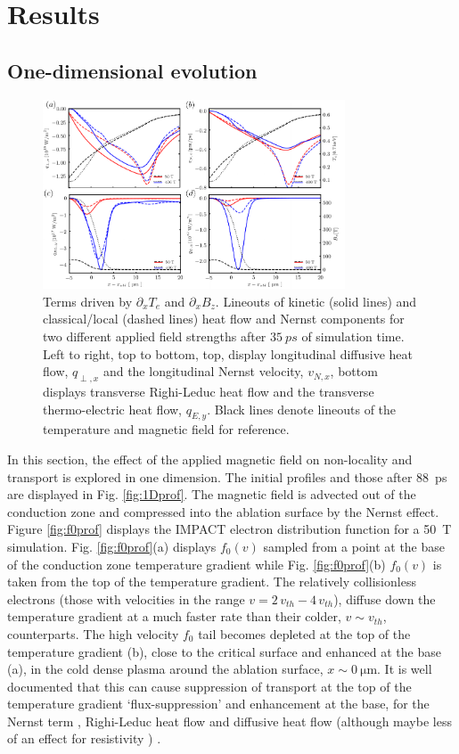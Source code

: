 \documentclass[aip,reprint]{revtex4-1}
\begin{document}
\section{Results}
\subsection{One-dimensional evolution}
\label{sec:1D}
\begin{figure}
	\includegraphics[width=0.8\textwidth]{pics/qlineouts_4plots.pdf}%
	\caption{\label{fig:qlineouts} \label{fig:qperp_1d} Terms driven by $\partial_x T_e$ and $\partial_x B_{z}$. Lineouts of kinetic (solid lines) and classical/local (dashed lines) heat flow  and Nernst components for two different applied field strengths after $\SI{35}{ps}$ of simulation time. Left to right, top to bottom, top, display longitudinal diffusive heat flow, $q_{\perp,x}$ and the longitudinal Nernst velocity, $v_{N,x}$, bottom displays transverse Righi-Leduc heat flow and the transverse thermo-electric heat flow, $q_{E,y}$. Black lines denote lineouts of the temperature and magnetic field for reference. }%
\end{figure}


In this section, the effect of the applied magnetic field on non-locality and transport is explored in one dimension. The initial profiles and those after \SI{88}{ps} are displayed in Fig. \ref{fig:1Dprof}.  The magnetic field is advected out of the conduction zone and compressed into the ablation surface by the Nernst effect. Figure \ref{fig:f0prof} displays the IMPACT electron distribution function  for a  \SI{50}{T}  simulation.  Fig. \ref{fig:f0prof}(a) displays $f_0(v)$ sampled from a point at the base of the conduction zone temperature gradient while Fig. \ref{fig:f0prof}(b) $f_0(v)$ is taken from the top of the temperature gradient. The relatively collisionless electrons (those with velocities in the range $v=2\,\si{v_{th}}-4\,\si{v_{th}}$), diffuse down the temperature gradient at a much faster rate than their colder, $v \sim \si{v_{th}}$, counterparts.   The high velocity $f_0$ tail becomes depleted at the top of the temperature gradient (b), close to the critical surface and enhanced at the base (a), in the cold dense plasma around the ablation surface, $x\sim \SI{0}{\micro\meter}$. It is well documented that this can cause suppression of transport at the top of the temperature gradient `flux-suppression' and enhancement at the base, for the Nernst term \cite{Brodrick2018,Joglekar2016}, Righi-Leduc heat flow \cite{Kho1985} and diffusive heat flow \cite{Bell1981} (although maybe less of an effect for resistivity \cite{Williams2013}) .
\end{document}

